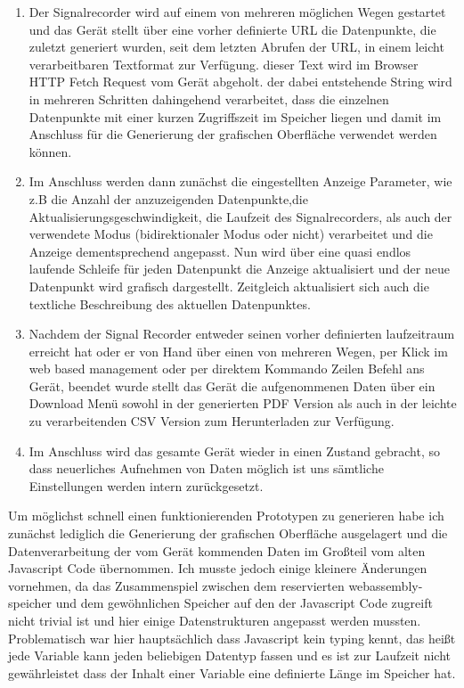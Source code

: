 \begin{enumerate}
        \item Der Signalrecorder wird auf einem von mehreren möglichen Wegen gestartet und das Gerät stellt über eine vorher definierte URL die Datenpunkte, die zuletzt generiert wurden, seit dem letzten Abrufen der URL, in einem leicht verarbeitbaren Textformat zur Verfügung. dieser Text wird im Browser HTTP Fetch Request vom Gerät abgeholt.  der dabei entstehende String wird in mehreren Schritten dahingehend  verarbeitet, dass die einzelnen Datenpunkte mit einer kurzen Zugriffszeit im Speicher liegen und damit im Anschluss für die Generierung der grafischen Oberfläche verwendet werden können. \\
        \item Im Anschluss werden dann zunächst die eingestellten Anzeige Parameter, wie z.B die Anzahl der anzuzeigenden Datenpunkte,die Aktualisierungsgeschwindigkeit, die Laufzeit des Signalrecorders, als auch der verwendete Modus (bidirektionaler Modus oder nicht) verarbeitet und die Anzeige dementsprechend angepasst. Nun wird über  eine quasi endlos laufende Schleife für jeden Datenpunkt die Anzeige aktualisiert und der neue Datenpunkt wird grafisch dargestellt. Zeitgleich aktualisiert sich auch die textliche Beschreibung des aktuellen Datenpunktes. \\
        \item Nachdem der Signal Recorder entweder seinen vorher definierten laufzeitraum erreicht hat oder er von Hand über einen von mehreren Wegen, per Klick im web based management oder per direktem Kommando Zeilen Befehl ans Gerät, beendet wurde stellt das Gerät die aufgenommenen Daten über ein Download Menü sowohl in der generierten PDF Version als auch in der leichte zu verarbeitenden CSV Version zum Herunterladen zur Verfügung. \\
        \item Im Anschluss wird das gesamte Gerät wieder in einen Zustand gebracht, so dass neuerliches Aufnehmen von Daten möglich ist  uns sämtliche Einstellungen werden intern zurückgesetzt. \\
\end{enumerate}
Um möglichst schnell einen funktionierenden Prototypen zu generieren habe ich zunächst lediglich die Generierung der grafischen Oberfläche ausgelagert und die Datenverarbeitung der vom Gerät kommenden Daten im Großteil vom alten Javascript Code übernommen. Ich musste jedoch einige kleinere Änderungen vornehmen, da das Zusammenspiel zwischen dem reservierten webassembly-speicher und dem gewöhnlichen Speicher auf den der Javascript Code zugreift nicht trivial ist und hier einige Datenstrukturen angepasst werden mussten.  Problematisch war hier hauptsächlich dass Javascript kein typing kennt,  das heißt jede Variable kann jeden beliebigen Datentyp fassen und es ist zur Laufzeit nicht gewährleistet dass der Inhalt einer Variable eine definierte Länge im Speicher hat. 
